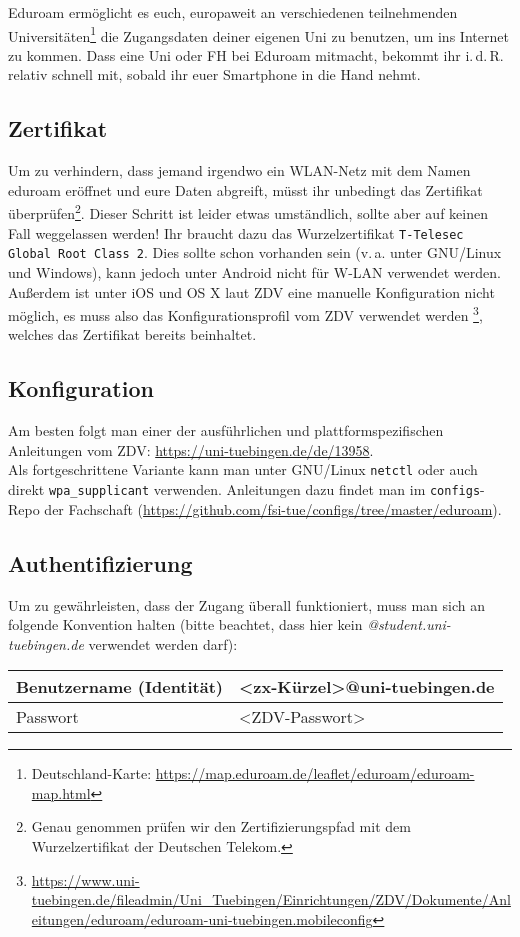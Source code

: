 Eduroam ermöglicht es euch, europaweit an verschiedenen teilnehmenden
Universitäten\footnote{Deutschland-Karte:
\url{https://map.eduroam.de/leaflet/eduroam/eduroam-map.html}} die Zugangsdaten	%
deiner eigenen Uni zu benutzen, um ins Internet zu kommen. Dass eine Uni oder
FH bei Eduroam mitmacht, bekommt ihr i.\,d.\,R. relativ schnell mit, sobald ihr
euer Smartphone in die Hand nehmt.

\subsection*{Zertifikat}
  Um zu verhindern, dass jemand irgendwo ein WLAN-Netz mit dem Namen eduroam
  eröffnet und eure Daten abgreift, müsst ihr unbedingt das Zertifikat
  überprüfen\footnote{Genau genommen prüfen wir den Zertifizierungspfad mit dem
  Wurzelzertifikat der Deutschen Telekom.}. Dieser Schritt ist leider etwas
  umständlich, sollte aber auf keinen Fall weggelassen werden! Ihr braucht dazu das Wurzelzertifikat \glqq\texttt{T-Telesec Global Root Class 2}\grqq. Dies
  sollte schon vorhanden sein (v.\,a. unter GNU/Linux und Windows), kann
  jedoch unter Android nicht für W-LAN verwendet werden. Außerdem ist unter iOS
  und OS X laut ZDV eine manuelle Konfiguration nicht möglich, es muss also das
  Konfigurationsprofil vom ZDV verwendet werden
  \footnote{\url{https://www.uni-tuebingen.de/fileadmin/Uni_Tuebingen/Einrichtungen/ZDV/Dokumente/Anleitungen/eduroam/eduroam-uni-tuebingen.mobileconfig}},
  welches das Zertifikat bereits beinhaltet.	%

\subsection*{Konfiguration}
  Am besten folgt man einer der ausführlichen und plattformspezifischen
  Anleitungen vom ZDV:
  \url{https://uni-tuebingen.de/de/13958}.\\	%
  Als fortgeschrittene Variante kann man unter GNU/Linux \texttt{netctl} oder auch
  direkt \texttt{wpa\_supplicant} verwenden. Anleitungen dazu findet man im
  \texttt{configs}-Repo der Fachschaft
  (\url{https://github.com/fsi-tue/configs/tree/master/eduroam}).	%

\subsection*{Authentifizierung}
  Um zu gewährleisten, dass der Zugang überall funktioniert, muss man sich an
  folgende Konvention halten (bitte beachtet, dass hier kein
  \emph{@student.uni-tuebingen.de} verwendet werden darf): \medskip \\
  \begin{tabular}{l|l}
    Benutzername (Identität) & <zx-Kürzel>@uni-tuebingen.de \\ \hline
    Passwort                 & <ZDV-Passwort>
  \end{tabular}

\vfill
